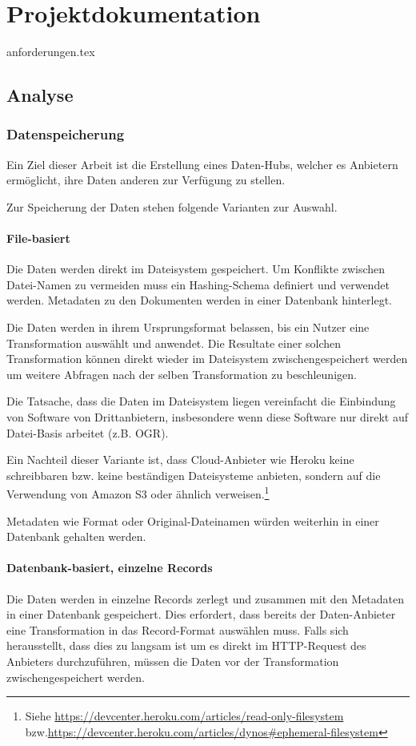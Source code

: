 \part{Projektdokumentation}

{anforderungen.tex}

\chapter{Analyse}


\section{Datenspeicherung}
Ein Ziel dieser Arbeit ist die Erstellung eines Daten-Hubs, welcher es Anbietern ermöglicht, ihre Daten anderen zur Verfügung zu stellen. 

Zur Speicherung der Daten stehen folgende Varianten zur Auswahl.

\subsection{File-basiert}
Die Daten werden direkt im Dateisystem gespeichert. Um Konflikte zwischen Datei-Namen zu vermeiden muss ein Hashing-Schema definiert und verwendet werden. Metadaten zu den Dokumenten werden in einer Datenbank hinterlegt.

Die Daten werden in ihrem Ursprungsformat belassen, bis ein Nutzer eine Transformation auswählt und anwendet. Die Resultate einer solchen Transformation können direkt wieder im Dateisystem zwischengespeichert werden um weitere Abfragen nach der selben Transformation zu beschleunigen.

Die Tatsache, dass die Daten im Dateisystem liegen vereinfacht die Einbindung von Software von Drittanbietern, insbesondere wenn diese Software nur direkt auf Datei-Basis arbeitet (z.B. OGR).

Ein Nachteil dieser Variante ist, dass Cloud-Anbieter wie Heroku keine schreibbaren bzw. keine beständigen Dateisysteme anbieten, sondern auf die Verwendung von Amazon S3 oder ähnlich verweisen.\footnote{Siehe \url{https://devcenter.heroku.com/articles/read-only-filesystem} bzw.\newline\url{https://devcenter.heroku.com/articles/dynos\#ephemeral-filesystem}}

Metadaten wie Format oder Original-Dateinamen würden weiterhin in einer Datenbank gehalten werden.

\subsection{Datenbank-basiert, einzelne Records}\label{sec:pd:datenbank-records}
Die Daten werden in einzelne Records zerlegt und zusammen mit den Metadaten in einer Datenbank gespeichert. Dies erfordert, dass bereits der Daten-Anbieter eine Transformation in das Record-Format auswählen muss. Falls sich herausstellt, dass dies zu langsam ist um es direkt im HTTP-Request des Anbieters durchzuführen, müssen die Daten vor der Transformation zwischengespeichert werden.

